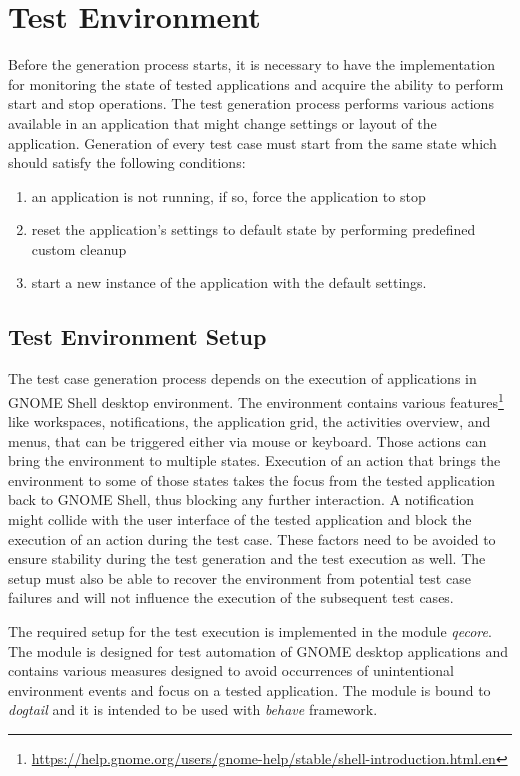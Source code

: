 \section{Test Environment}
Before the generation process starts, it is necessary to have the implementation for monitoring the state of tested applications and acquire the ability to perform start and stop operations. The test generation process performs various actions available in an application that might change settings or layout of the application. Generation of every test case must start from the same state which should satisfy the following conditions: 
\begin{enumerate}
    \item an application is not running, if so, force the application to stop
    \item reset the application's settings to default state by performing predefined custom cleanup
    \item start a new instance of the application with the default settings.
\end{enumerate}

\subsection{Test Environment Setup}
The test case generation process depends on the execution of applications in GNOME Shell desktop environment. The environment contains various features\footnote{\url{https://help.gnome.org/users/gnome-help/stable/shell-introduction.html.en}} like workspaces, notifications, the application grid, the activities overview, and menus, that can be triggered either via mouse or keyboard. Those actions can bring the environment to multiple states. Execution of an action that brings the environment to some of those states takes the focus from the tested application back to GNOME Shell, thus blocking any further interaction. A notification might collide with the user interface of the tested application and block the execution of an action during the test case. These factors need to be avoided to ensure stability during the test generation and the test execution as well. The setup must also be able to recover the environment from potential test case failures and will not influence the execution of the subsequent test cases. 

The required setup for the test execution is implemented in the module \textit{qecore}. The module is designed for test automation of GNOME desktop applications and contains various measures designed to avoid occurrences of unintentional environment events and focus on a tested application. The module is bound to \textit{dogtail} and it is intended to be used with \textit{behave} framework.\cite{qecore} 

